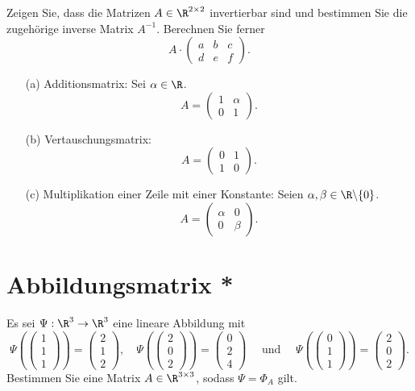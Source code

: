 Zeigen Sie, dass die Matrizen $A\in \R^{2\times 2}$ invertierbar sind und bestimmen Sie die zugeh\"orige inverse Matrix $A^{-1}$.
Berechnen Sie ferner
		$$
			A
			\cdot
			\begin{pmatrix}
				a & b & c\\
				d & e  & f
			\end{pmatrix}.
		$$
\begin{itemize}
	\item[(a)] Additionsmatrix:	
		Sei $\alpha \in \R$. 
		$$
			A
			=
			\begin{pmatrix}
				1 & \alpha\\
				0 & 1
			\end{pmatrix}.
		$$

	\item[(b)] Vertauschungsmatrix:
		$$
			A
			=
			\begin{pmatrix}
				0 & 1\\
				1 & 0
			\end{pmatrix}.
		$$

	\item[(c)] Multiplikation einer Zeile mit einer Konstante:
		Seien $\alpha, \beta \in \R\backslash\{0\}$. 
		$$
			A
			=
			\begin{pmatrix}
				\alpha 	& 0\\
				0 		& \beta
			\end{pmatrix}.
		$$
	
\end{itemize}

\section{Abbildungsmatrix *}
Es sei $\Psi: \R^3 \to \R^3$ eine lineare Abbildung mit
$$
\Psi(\begin{pmatrix}1\\1\\1 \end{pmatrix}) = \begin{pmatrix}2 \\ 1 \\ 2 \end{pmatrix}, \quad \Psi(\begin{pmatrix} 2 \\ 0\\ 2 \end{pmatrix}) = \begin{pmatrix}0\\2\\4 \end{pmatrix} \quad \text{ und } \quad \Psi(\begin{pmatrix} 0\\1\\1\end{pmatrix} )= \begin{pmatrix} 2 \\ 0 \\ 2\end{pmatrix}.
$$
Bestimmen Sie eine Matrix $A \in \R^{3\times 3}$, sodass $\Psi=\Phi_A$ gilt. 



